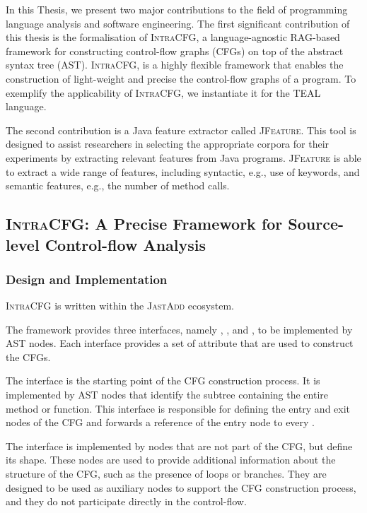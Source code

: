 \label{sec:contribution}
In this Thesis, we present two major contributions to the field of programming 
language analysis and software engineering. 
The first significant contribution of this thesis is the formalisation of \textsc{IntraCFG},
a language-agnostic RAG-based framework for constructing control-flow graphs (CFGs) 
on top of the abstract syntax tree (AST). \textsc{IntraCFG}, is a highly flexible
framework that enables the construction of light-weight and precise the control-flow graphs
of a program. To exemplify the applicability of \textsc{IntraCFG}, we instantiate it for the TEAL language.

The second contribution is a Java feature extractor called \textsc{JFeature}.
This tool is designed to assist researchers in selecting the appropriate corpora
for their experiments by extracting relevant features from Java programs. 
\textsc{JFeature} is able to extract a wide range of features, 
including syntactic, e.g., use of keywords, and semantic features, e.g.,
the number of method calls.


\subsection{\textsc{IntraCFG}: A Precise Framework for Source-level Control-flow Analysis}

\subsubsection*{Design and Implementation}
\textsc{IntraCFG} is written within the \textsc{JastAdd} ecosystem.

The framework provides three interfaces, namely , , and ,
to be implemented by AST nodes. Each interface provides a set of attribute that are used to construct
the CFGs.

The  interface is the starting point of the CFG construction process.
It is implemented by AST nodes that identify the subtree containing the entire method 
or function. This interface is responsible for defining the entry and exit nodes of the CFG and 
forwards a reference of the entry node to every .


The  interface is implemented by nodes that are not part of the CFG,
but define its shape. These nodes are used to provide additional information 
about the structure of the CFG, such as the presence of loops or branches. 
They are designed to be used as auxiliary nodes to support the CFG construction 
process, and they do not participate directly in the control-flow.